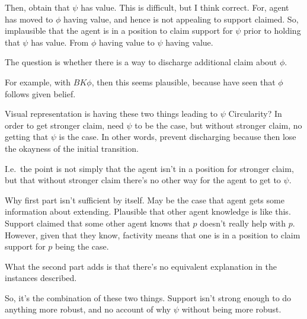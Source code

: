 \begin{note}[Explanation of \nI{}]
  Then, obtain that \(\psi\) has value.
  This is difficult, but I think correct.
  For, agent has moved to \(\phi\) having value, and hence is not appealing to support claimed.
  So, implausible that the agent is in a position to claim support for \(\psi\) prior to holding that \(\psi\) has value.
  From \(\phi\) having value to \(\psi\) having value.

  The question is whether there is a way to discharge additional claim about \(\phi\).

  For example, with \(BK\phi\), then this seems plausible, because have seen that \(\phi\) follows given belief.

  {Visual representation is having these two things leading to \(\psi\)}
  Circularity?
  In order to get stronger claim, need \(\psi\) to be the case, but without stronger claim, no getting that \(\psi\) is the case.
  In other words, prevent discharging because then lose the okayness of the initial transition.

  I.e.\ the point is not simply that the agent isn't in a position for stronger claim, but that without stronger claim there's no other way for the agent to get to \(\psi\).
\end{note}

\begin{note}[Clarifying]
  Why first part isn't sufficient by itself.
  May be the case that agent gets some information about extending.
  Plausible that other agent knowledge is like this.
  Support claimed that some other agent knows that \(p\) doesn't really help with \(p\).
  However, given that they know, factivity means that one is in a position to claim support for \(p\) being the case.

  What the second part adds is that there's no equivalent explanation in the instances described.

  So, it's the combination of these two things.
  Support isn't strong enough to do anything more robust, and no account of why \(\psi\) without being more robust.
\end{note}

